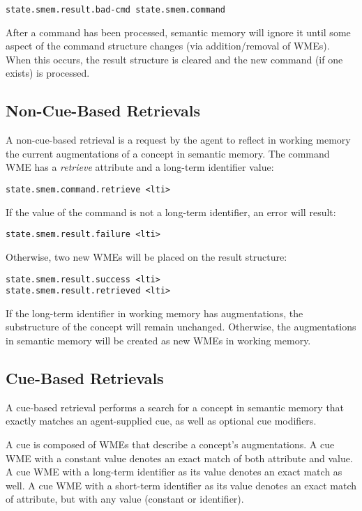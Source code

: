 \begin{verbatim}
state.smem.result.bad-cmd state.smem.command
\end{verbatim}

After a command has been processed, semantic memory will ignore it until some aspect of the command structure changes (via addition/removal of WMEs).  When this occurs, the result structure is cleared and the new command (if one exists) is processed.

\subsection{Non-Cue-Based Retrievals}
A non-cue-based retrieval is a request by the agent to reflect in working memory the current augmentations of a concept in semantic memory. The command WME has a \emph{retrieve} attribute and a long-term identifier value:

\begin{verbatim}
state.smem.command.retrieve <lti>
\end{verbatim}

If the value of the command is not a long-term identifier, an error will result: 

\begin{verbatim}
state.smem.result.failure <lti>
\end{verbatim}

Otherwise, two new WMEs will be placed on the result structure:

\begin{verbatim}
state.smem.result.success <lti>
state.smem.result.retrieved <lti>
\end{verbatim}

If the long-term identifier in working memory has augmentations, the substructure of the concept will remain unchanged. Otherwise, the augmentations in semantic memory will be created as new WMEs in working memory.

\subsection{Cue-Based Retrievals}
A cue-based retrieval performs a search for a concept in semantic memory that exactly matches an agent-supplied cue, as well as optional cue modifiers.

A cue is composed of WMEs that describe a concept's augmentations.  A cue WME with a constant value denotes an exact match of both attribute and value.  A cue WME with a long-term identifier as its value denotes an exact match as well.  A cue WME with a short-term identifier as its value denotes an exact match of attribute, but with any value (constant or identifier).  


